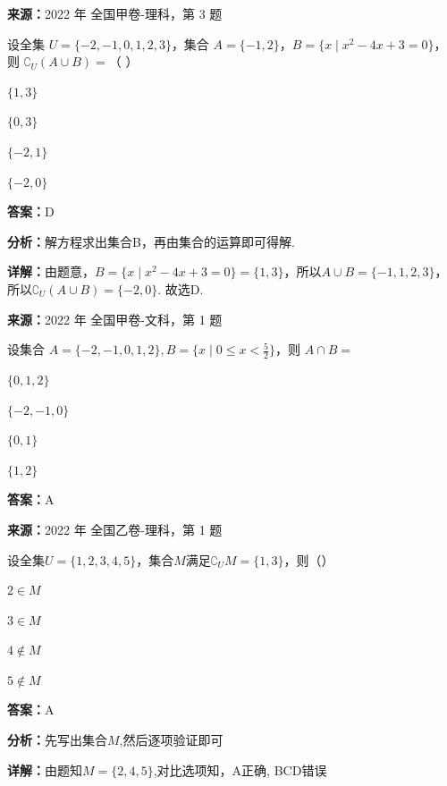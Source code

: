\begin{question}[points=5]
\textbf{来源：}2022 年 全国甲卷-理科，第 3 题\par
设全集 $U=\{-2,-1,0,1,2,3\}$，集合 $A=\{-1,2\}$，$B=\{x \mid x^2-4x+3=0\}$，则 $\complement_U(A \cup B)=$（ ）
\begin{choices}
  \item $\{1,3\}$
  \item $\{0,3\}$
  \item $\{-2,1\}$
  \item $\{-2,0\}$
\end{choices}
\begin{solution}
\textbf{答案：}D

\textbf{分析：}解方程求出集合B，再由集合的运算即可得解.

\textbf{详解：}由题意，$B=\{x\mid x^2-4x+3=0\}=\{1,3\}$，所以$A\cup B=\{-1,1,2,3\}$，所以$\complement_U(A\cup B)=\{-2,0\}$. 故选D.
\end{solution}
\end{question}

\begin{question}[points=5]
\textbf{来源：}2022 年 全国甲卷-文科，第 1 题\par
设集合 $A=\{-2,-1,0,1,2\}, B=\{x \mid 0 \leq x < \frac{5}{2}\}$，则 $A \cap B=$
\begin{choices}
  \item $\{0,1,2\}$
  \item $\{-2,-1,0\}$
  \item $\{0,1\}$
  \item $\{1,2\}$
\end{choices}
\begin{solution}
\textbf{答案：}A
\end{solution}
\end{question}

\begin{question}[points=5]
\textbf{来源：}2022 年 全国乙卷-理科，第 1 题\par
设全集$U = \{1, 2, 3, 4, 5\}$，集合$M$满足$\complement_U M = \{1, 3\}$，则（\qquad）
\begin{choices}
  \item $2 \in M$
  \item $3 \in M$
  \item $4 \notin M$
  \item $5 \notin M$
\end{choices}
\begin{solution}
\textbf{答案：}A

\textbf{分析：}先写出集合$M$,然后逐项验证即可

\textbf{详解：}由题知$M = \{2, 4, 5\}$,对比选项知，A正确, BCD错误
\end{solution}
\end{question}

